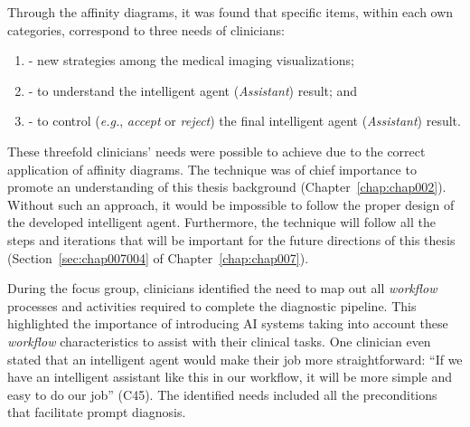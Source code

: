 
\vspace{0.05mm}

\noindent
Through the affinity diagrams, it was found that specific items, within each own categories, correspond to three needs of clinicians:

\vspace{0.10mm}

\begin{enumerate}[label=\alph*]
\item - new strategies among the medical imaging visualizations;
\item - to understand the intelligent agent ({\it Assistant}) result; and
\item - to control ({\it e.g.}, {\it accept} or {\it reject}) the final intelligent agent ({\it Assistant}) result.
\end{enumerate}

\vspace{0.10mm}

These threefold clinicians' needs were possible to achieve due to the correct application of affinity diagrams.
The technique was of chief importance to promote an understanding of this thesis background (Chapter~\ref{chap:chap002}).
Without such an approach, it would be impossible to follow the proper design of the developed intelligent agent.
Furthermore, the technique will follow all the steps and iterations that will be important for the future directions of this thesis (Section~\ref{sec:chap007004} of Chapter~\ref{chap:chap007}).

During the focus group, clinicians identified the need to map out all {\it workflow} processes and activities required to complete the diagnostic pipeline.
This highlighted the importance of introducing \ac{AI} systems taking into account these {\it workflow} characteristics to assist with their clinical tasks.
One clinician even stated that an intelligent agent would make their job more straightforward:
``If we have an intelligent assistant like this in our workflow, it will be more simple and easy to do our job'' (C45).
The identified needs included all the preconditions that facilitate prompt diagnosis.

